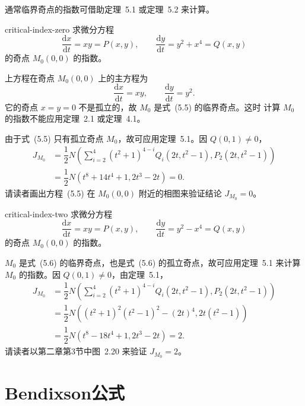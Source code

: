 通常临界奇点的指数可借助定理~5.1 或定理~5.2 来计算。

\begin{example}{}{critical-index-zero}
求微分方程
\[
\dfrac{\mathrm{d}x}{\mathrm{d}t}=xy=P(x,y),\qquad
\dfrac{\mathrm{d}y}{\mathrm{d}t}=y^2+x^4=Q(x,y) \tag{5.5}
\]
的奇点 $M_0(0,0)$ 的指数。
\end{example}

\begin{solution}
上方程在奇点 $M_0(0,0)$ 上的主方程为
\[
\dfrac{\mathrm{d}x}{\mathrm{d}t}=xy,\qquad
\dfrac{\mathrm{d}y}{\mathrm{d}t}=y^2.
\]
它的奇点 $x=y=0$ 不是孤立的，故 $M_0$ 是式~(5.5) 的临界奇点。这时
计算 $M_0$ 的指数不能应用定理~2.1 或定理~4.1。

由于式~(5.5) 只有孤立奇点 $M_0$，故可应用定理~5.1。因 $Q(0,1)\ne0$，
\[
\begin{aligned}
J_{M_0}
&=\dfrac12N\left(
\sum_{i=2}^{4}(t^2+1)^{4-i}Q_i(2t,t^2-1),P_2(2t,t^2-1)
\right)\\
&=\dfrac12N(t^8+14t^4+1,2t^3-2t)=0.
\end{aligned}
\]
请读者画出方程~(5.5) 在 $M_0(0,0)$ 附近的相图来验证结论 $J_{M_0}=0$。
\end{solution}

\begin{example}{}{critical-index-two}
求微分方程
\[
\dfrac{\mathrm{d}x}{\mathrm{d}t}=xy=P(x,y),\qquad
\dfrac{\mathrm{d}y}{\mathrm{d}t}=y^2-x^4=Q(x,y) \tag{5.6}
\]
的奇点 $M_0(0,0)$ 的指数。
\end{example}

\begin{solution}
$M_0$ 是式~(5.6) 的临界奇点，也是式~(5.6) 的孤立奇点，故可应用定理~5.1
来计算 $M_0$ 的指数。因 $Q(0,1)\ne0$，由定理~5.1，
\[
\begin{aligned}
J_{M_0}
&=\dfrac12N\left(
\sum_{i=2}^{4}(t^2+1)^{4-i}Q_i(2t,t^2-1),P_2(2t,t^2-1)
\right)\\
&=\dfrac12N\left((t^2+1)^2(t^2-1)^2-(2t)^4,2t(t^2-1)\right)\\
&=\dfrac12N(t^8-18t^4+1,2t^3-2t)=2.
\end{aligned}
\]
请读者以第二章第3节中图~2.20 来验证 $J_{M_0}=2$。
\end{solution}

\section{Bendixson公式}

